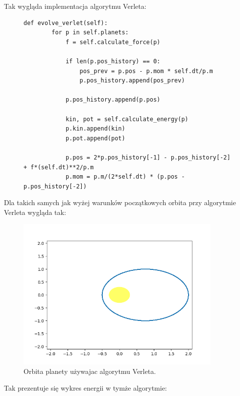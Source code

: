\documentclass[10pt,a4paper]{article}
\begin{document}
	Tak wygląda implementacja algorytmu Verleta:
	
	\begin{figure} [htp!]
	\begin{lstlisting}
def evolve_verlet(self):
        for p in self.planets:
            f = self.calculate_force(p)

            if len(p.pos_history) == 0:
                pos_prev = p.pos - p.mom * self.dt/p.m
                p.pos_history.append(pos_prev)

            p.pos_history.append(p.pos)

            kin, pot = self.calculate_energy(p)
            p.kin.append(kin)
            p.pot.append(pot)

            p.pos = 2*p.pos_history[-1] - p.pos_history[-2] + f*(self.dt)**2/p.m
            p.mom = p.m/(2*self.dt) * (p.pos - p.pos_history[-2])
\end{lstlisting}
	\end{figure}
		
	
	Dla takich samych jak wyżej warunków początkowych orbita przy algorytmie Verleta 
	wygląda tak:
	
	\begin{figure}[htp!!!!!!!]	
		\begin{center}
			\includegraphics[width = 0.9\textwidth]{verlet_orbit.png}
			\caption{Orbita planety używajac algorytmu Verleta.}
			\label{schemat}
		\end{center}
	\end{figure} 

	Tak prezentuje się wykres energii w tymże algorytmie:
	
\end{document}
